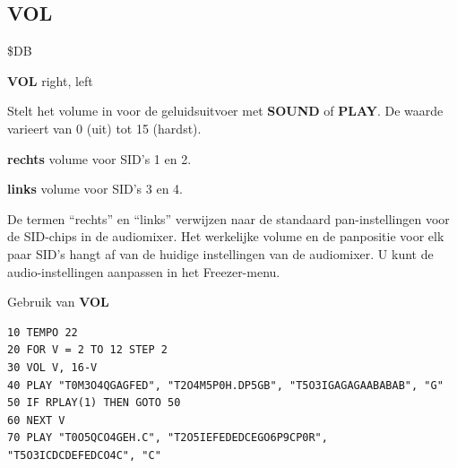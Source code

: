 \subsection{VOL}
\begin{description}[leftmargin=2cm,style=nextline]
\item [Token:]    \$DB

\item [Formaat:]   {\bf VOL} right, left

\item [Gebruik:]    Stelt het volume in voor de geluidsuitvoer met {\bf SOUND} of {\bf PLAY}. De waarde varieert van 0 (uit) tot 15 (hardst).

                  {\bf rechts} volume voor SID's 1 en 2.

                  {\bf links} volume voor SID's 3 en 4.

\item [Opmerkingen:]  De termen ``rechts'' en ``links'' verwijzen naar de standaard pan-instellingen voor de SID-chips in de audiomixer. Het werkelijke volume en de panpositie voor elk paar SID's hangt af van de huidige instellingen van de audiomixer. U kunt de audio-instellingen aanpassen in het Freezer-menu.

\item [Voorbeeld:]  Gebruik van {\bf VOL}

\begin{tcolorbox}[colback=black,coltext=white]
\verbatimfont{\codefont}
\begin{verbatim}
10 TEMPO 22
20 FOR V = 2 TO 12 STEP 2
30 VOL V, 16-V
40 PLAY "T0M3O4QGAGFED", "T2O4M5P0H.DP5GB", "T5O3IGAGAGAABABAB", "G"
50 IF RPLAY(1) THEN GOTO 50
60 NEXT V
70 PLAY "T0O5QCO4GEH.C", "T2O5IEFEDEDCEGO6P9CP0R", "T5O3ICDCDEFEDCO4C", "C"
\end{verbatim}
\end{tcolorbox}
\end{description}


\newpage
